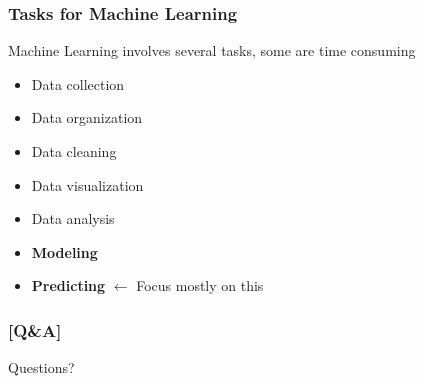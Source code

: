\documentclass[xcolor=x11names,compress, aspectratio=169]{beamer}
\renewcommand{\(}{\begin{columns}}
\renewcommand{\)}{\end{columns}}
\newcommand{\<}[1]{\begin{column}{#1}}
\renewcommand{\>}{\end{column}}
\begin{document}
\begin{frame}
\frametitle{\textcolor{brique}{ Tasks for Machine Learning }}
Machine Learning involves several tasks, some are time consuming
\pause
\begin{itemize}[<+->]
    \item Data collection
    \item Data organization
    \item Data cleaning
    \item Data visualization
    \item Data analysis
    \item \textbf{Modeling}
    \item \textbf{Predicting} $\leftarrow$ Focus mostly on this
\end{itemize}
\end{frame}

\begin{frame} %
\frametitle{\textcolor{brique}{[Q\&A]}}
\begin{center}
\Large \textcolor{siap}{ Questions?}
\end{center}

\end{frame}
\end{document}
